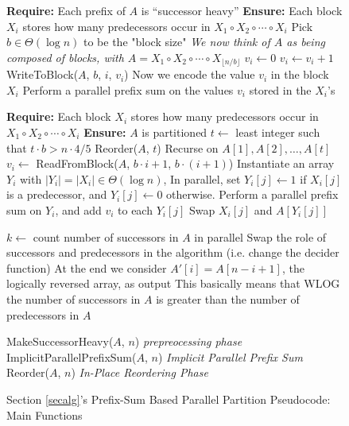 \documentclass[twocolumn,10pt]{article}
\theoremstyle{remark}
\theoremstyle{remark}
\begin{document}
\begin{figure*}
  \caption{Section \ref{secalg}'s Prefix-Sum Based Parallel Partition Pseudocode: Main Functions}
	\label{alg:parallelPartition_prefixsumbased_main}
  \begin{algorithmic} %
    \State \textbf{Require: } Each prefix of $A$ is ``successor heavy''
    \State \textbf{Ensure: }  Each block $X_i$ stores how many predecessors occur in $X_1 \circ X_2 \circ \cdots \circ X_i$
      \State Pick $b \in \Theta(\log n)$ to be the "block size"
      \Comment \emph{We now think of $A$ as being composed of blocks, with $A = X_1 \circ X_2 \circ \cdots \circ X_{\lfloor n/b \rfloor}$}
        \State $v_i \gets 0$  
            \State $v_i \gets v_i + 1$
          \EndIf
        \EndFor
        \State WriteToBlock($A$, $b$, $i$, $v_i$)
        \Comment Now we encode the value $v_i$ in the block $X_i$
      \EndFor
      \State Perform a parallel prefix sum on the values $v_i$ stored in the $X_i$'s
   \EndProcedure
    \State

  \State \textbf{Require: } Each block $X_i$ stores how many predecessors occur in $X_1 \circ X_2 \circ \cdots \circ X_i$
  \State \textbf{Ensure: }  $A$ is partitioned
      \State $t \gets $ least integer such that $t\cdot b > n\cdot 4/5$
      \State Reorder($A$, $t$)
      \Comment Recurse on $A[1], A[2], \ldots, A[t]$
      \State $v_i \gets$ ReadFromBlock($A$, $b\cdot i+1$, $b\cdot(i+1)$) 
        \State Instantiate an array $Y_i$ with $|Y_i| = |X_i| \in \Theta(\log n)$, 
        \State In parallel, set $Y_i[j] \gets 1$ if $X_i[j]$ is a predecessor, and $Y_i[j] \gets 0$ otherwise.
        \State Perform a parallel prefix sum on $Y_i$, and add $v_i$ to each $Y_i[j]$
            \State Swap $X_i[j]$ and $A[Y_i[j]]$
          \EndIf
        \EndFor
      \EndFor
    \EndProcedure
    \State

      \State $k \gets$ count number of successors in $A$ in parallel
        \State Swap the role of successors and predecessors in the algorithm (i.e. change the decider function)
        \State At the end we consider $A'[i] = A[n-i+1]$, the logically reversed array, as output
        \State This basically means that WLOG the number of successors in $A$ is greater than the number of predecessors in $A$
      \EndIf

      \State MakeSuccessorHeavy($A$, $n$) \Comment \emph{prepreocessing phase}
      \State ImplicitParallelPrefixSum($A$, $n$) \Comment \emph{Implicit Parallel Prefix Sum}
      \State Reorder($A$, $n$) \Comment \emph{In-Place Reordering Phase}
    \EndProcedure
	\end{algorithmic}	
\end{figure*}

\clearpage
\clearpage



\end{document}
